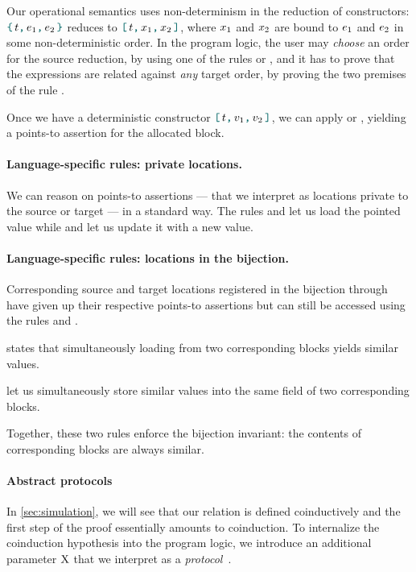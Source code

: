 Our operational semantics uses non-determinism in the reduction of constructors: $\datalangBlock{\datalangTag}{\datalangExpr_1}{\datalangExpr_2}$ reduces to $\datalangBlockDet{\datalangTag}{\datalangVar_1}{\datalangVar_2}$, where $\datalangVar_1$ and $\datalangVar_2$ are bound to $\datalangExpr_1$ and $\datalangExpr_2$ in some non-deterministic order.
In the program logic, the user may \emph{choose} an order for the source reduction, by using one of the rules  or , and it has to prove that the expressions are related against \emph{any} target order, by proving the two premises of the rule .

Once we have a deterministic constructor $\datalangBlockDet{\datalangTag}{\datalangVal_1}{\datalangVal_2}$, we can apply  or , yielding a points-to assertion for the allocated block.

\paragraph{Language-specific rules: private locations.}
We can reason on points-to assertions --- that we interpret as locations private to the source or target --- in a standard way.
The rules  and  let us load the pointed value while  and  let us update it with a new value.

\paragraph{Language-specific rules: locations in the bijection.}
Corresponding source and target locations registered in the bijection through  have given up their respective points-to assertions but can still be accessed using the rules  and .

 states that simultaneously loading from two corresponding blocks yields similar values.

 let us simultaneously store similar values into the same field of two corresponding blocks.

Together, these two rules enforce the bijection invariant: the contents of corresponding blocks are always similar.

\paragraph{Abstract protocols}
In \cref{sec:simulation}, we will see that our relation is defined coinductively and the first step of the proof essentially amounts to coinduction.
To internalize the coinduction hypothesis into the program logic, we introduce an additional parameter $\mathrm{X}$ that we interpret as a \emph{protocol}~\citep*{de-vilhena-2021}.

